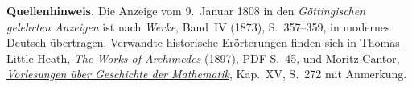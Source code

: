 \par\medskip\begin{small}\noindent\textbf{Quellenhinweis.} Die Anzeige vom 9.~Januar 1808 in den \textit{Göttingischen gelehrten Anzeigen} ist nach \textit{Werke}, Band~IV (1873), S.~357--359, in modernes Deutsch übertragen. Verwandte historische Erörterungen finden sich in \href{https://tonywilliams1990.github.io/great_works/Archimedes/The_Works_of_Archimedes.pdf}{Thomas Little Heath, \textit{The Works of Archimedes} (1897)}, PDF-S.~45, und \href{https://www.e-rara.ch/download/pdf/5691450.pdf}{Moritz Cantor, \textit{Vorlesungen über Geschichte der Mathematik}}, Kap.~XV, S.~272 mit Anmerkung.\par\end{small}

